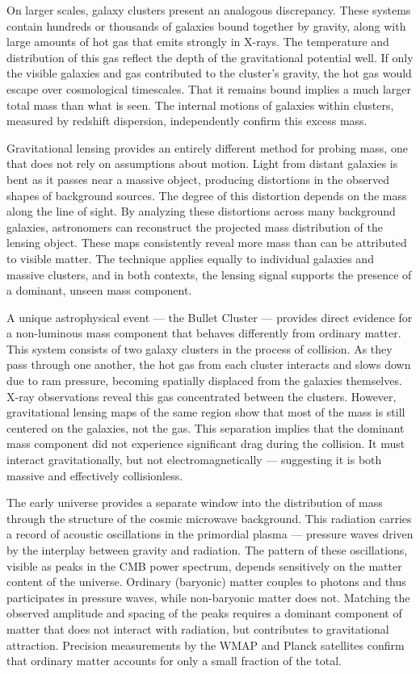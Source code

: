 On larger scales, galaxy clusters present an analogous discrepancy. These systems contain hundreds or thousands of galaxies bound together by gravity, along with large amounts of hot gas that emits strongly in X-rays. The temperature and distribution of this gas reflect the depth of the gravitational potential well. If only the visible galaxies and gas contributed to the cluster’s gravity, the hot gas would escape over cosmological timescales. That it remains bound implies a much larger total mass than what is seen. The internal motions of galaxies within clusters, measured by redshift dispersion, independently confirm this excess mass.

Gravitational lensing provides an entirely different method for probing mass, one that does not rely on assumptions about motion. Light from distant galaxies is bent as it passes near a massive object, producing distortions in the observed shapes of background sources. The degree of this distortion depends on the mass along the line of sight. By analyzing these distortions across many background galaxies, astronomers can reconstruct the projected mass distribution of the lensing object. These maps consistently reveal more mass than can be attributed to visible matter. The technique applies equally to individual galaxies and massive clusters, and in both contexts, the lensing signal supports the presence of a dominant, unseen mass component.

A unique astrophysical event — the Bullet Cluster — provides direct evidence for a non-luminous mass component that behaves differently from ordinary matter. This system consists of two galaxy clusters in the process of collision. As they pass through one another, the hot gas from each cluster interacts and slows down due to ram pressure, becoming spatially displaced from the galaxies themselves. X-ray observations reveal this gas concentrated between the clusters. However, gravitational lensing maps of the same region show that most of the mass is still centered on the galaxies, not the gas. This separation implies that the dominant mass component did not experience significant drag during the collision. It must interact gravitationally, but not electromagnetically — suggesting it is both massive and effectively collisionless.

The early universe provides a separate window into the distribution of mass through the structure of the cosmic microwave background. This radiation carries a record of acoustic oscillations in the primordial plasma — pressure waves driven by the interplay between gravity and radiation. The pattern of these oscillations, visible as peaks in the CMB power spectrum, depends sensitively on the matter content of the universe. Ordinary (baryonic) matter couples to photons and thus participates in pressure waves, while non-baryonic matter does not. Matching the observed amplitude and spacing of the peaks requires a dominant component of matter that does not interact with radiation, but contributes to gravitational attraction. Precision measurements by the WMAP and Planck satellites confirm that ordinary matter accounts for only a small fraction of the total.

